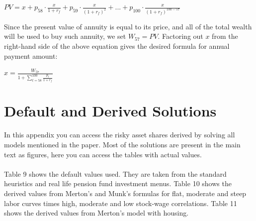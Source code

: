 \documentclass[]{article}
\begin{document}
\begin{appendix}
\begin{center}
	$PV = x + p_{58} \cdot \frac{x}{1+r_f} + p_{59} \cdot \frac{x}{(1+r_f)^2} + ... + p_{100} \cdot \frac{x}{(1+r_f)^{100-57}}$
\end{center}

Since the present value of annuity is equal to its price, and all of the total wealth will be used to buy such annuity, we set $W_{57}=PV$. Factoring out $x$ from the right-hand side of the above equation gives the desired formula for annual payment amount:

\begin{center}
	$x = \frac{W_{57}}{1+\displaystyle\sum^{100}_{t=58} \frac{p_t}{1+r_f}}$ 
\end{center}


\section{Default and Derived Solutions}
\label{appe}

In this appendix you can access the risky asset shares derived by solving all models mentioned in the paper. Most of the solutions are present in the main text as figures, here you can access the tables with actual values.

\paragraph{}Table 9 shows the default values used. They are taken from the standard heuristics and real life pension fund investment menus. Table 10 shows the derived values from Merton's and Munk's formulas for flat, moderate and steep labor curves times high, moderate and low stock-wage correlations. Table 11 shows the derived values from Merton's model with housing.
 

\end{appendix}
\end{document}

